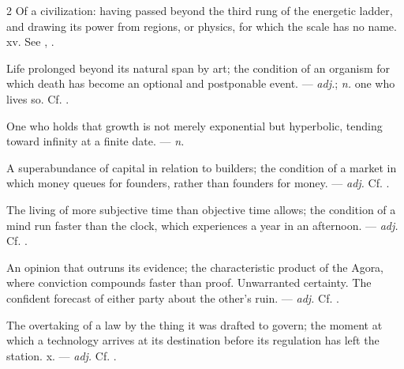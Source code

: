 \begin{multicols}{2}
 Of a civilization: having passed beyond the third rung of the energetic ladder, and drawing its power from regions, or physics, for which the scale has no name.   xv. See , .

 Life prolonged beyond its natural span by art; the condition of an organism for which death has become an optional and postponable event. —  \textit{adj.};  \textit{n.} one who lives so. Cf. .

 One who holds that growth is not merely exponential but hyperbolic, tending toward infinity at a finite date. —  \textit{n.}

 A superabundance of capital in relation to builders; the condition of a market in which money queues for founders, rather than founders for money.   —  \textit{adj.} Cf. .

 The living of more subjective time than objective time allows; the condition of a mind run faster than the clock, which experiences a year in an afternoon.  —  \textit{adj.} Cf. .

 An opinion that outruns its evidence; the characteristic product of the Agora, where conviction compounds faster than proof.   Unwarranted certainty.   The confident forecast of either party about the other's ruin. —  \textit{adj.} Cf. .

 The overtaking of a law by the thing it was drafted to govern; the moment at which a technology arrives at its destination before its regulation has left the station.   x. —  \textit{adj.} Cf. .


\end{multicols}
